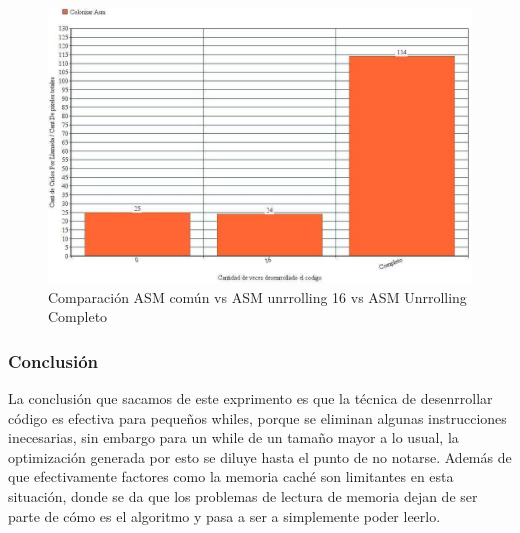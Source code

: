\begin{figure}[H]
\centering
\captionsetup{justification=centering}
	\includegraphics[width = 15 cm, height = 9 cm]{imagenes/unroll.jpg}
	\caption[center]{Comparación ASM común vs ASM unrrolling 16 vs ASM Unrrolling Completo}
\end{figure}
\medskip
	
\subsubsection{Conclusión}
\par{La conclusión que sacamos de este exprimento es que la técnica de desenrrollar código es efectiva para pequeños whiles, porque se eliminan algunas instrucciones inecesarias, sin embargo para un while de un tamaño mayor a lo usual, la optimización generada por esto se diluye hasta el punto de no notarse. Además de que efectivamente factores como la memoria caché son limitantes en esta situación, donde se da que los problemas de lectura de memoria dejan de ser parte de cómo es el algoritmo y pasa a ser a simplemente poder leerlo.}